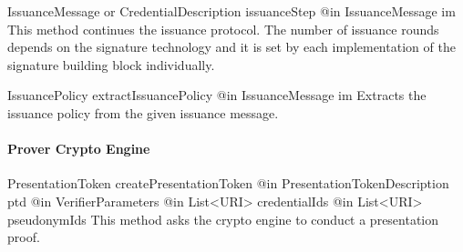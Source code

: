       \begin{method}
      {IssuanceMessage or CredentialDescription}
      {issuanceStep}
      {
        {@in IssuanceMessage im}
      }
      This method continues the issuance protocol. The number of issuance rounds depends on the signature 
      technology and it is set by each implementation of the signature building block individually.
      \end{method}
      
      \begin{method}
      {IssuancePolicy}
      {extractIssuancePolicy}
      {
        {@in IssuanceMessage im}
      }
      Extracts the issuance policy from the given issuance message.
      \end{method}

  
  \paragraph{Prover Crypto Engine}

      \begin{method}
      {PresentationToken}
      {createPresentationToken}
      {
        {@in PresentationTokenDescription ptd}
        {@in VerifierParameters}
        {@in List<URI> credentialIds}
        {@in List<URI> pseudonymIds}
      }
      This method asks the crypto engine to conduct a presentation proof.
      \end{method}
      
      
